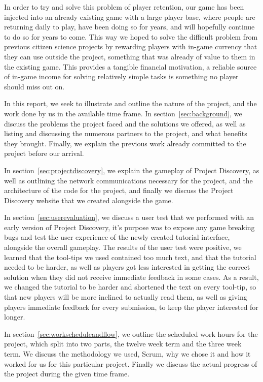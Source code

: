 In order to try and solve this problem of player retention, our game has been injected into an already existing game with a large player base, where people are returning daily to play, have been doing so for years, and will hopefully continue to do so for years to come. This way we hoped to solve the difficult problem from previous citizen science projects by rewarding players with in-game currency that they can use outside the project, something that was already of value to them in the existing game. This provides a tangible financial motivation, a reliable source of in-game income for solving relatively simple tasks is something no player should miss out on.

In this report, we seek to illustrate and outline the nature of the project, and the work done by us in the available time frame. In section~\ref{sec:background}, we discuss the problems the project faced and the solutions we offered, as well as listing and discussing the numerous partners to the project, and what benefits they brought. Finally, we explain the previous work already committed to the project before our arrival.

In section~\ref{sec:projectdiscovery}, we explain the gameplay of Project Discovery, as well as outlining the network communications necessary for the project, and the architecture of the code for the project, and finally we discuss the Project Discovery website that we created alongside the game. 

In section~\ref{sec:userevaluation}, we discuss a user test that we performed with an early version of Project Discovery, it's purpose was to expose any game breaking bugs and test the user experience of the newly created tutorial interface, alongside the overall gameplay. The results of the user test were positive, we learned that the tool-tips we used contained too much text, and that the tutorial needed to be harder, as well as players got less interested in getting the correct solution when they did not receive immediate feedback in some cases. As a result, we changed the tutorial to be harder and shortened the text on every tool-tip, so that new players will be more inclined to actually read them, as well as giving players immediate feedback for every submission, to keep the player interested for longer.

In section~\ref{sec:workscheduleandflow}, we outline the scheduled work hours for the project, which split into two parts, the twelve week term and the three week term. We discuss the methodology we used, Scrum, why we chose it and how it worked for us for this particular project. Finally we discuss the actual progress of the project during the given time frame.

